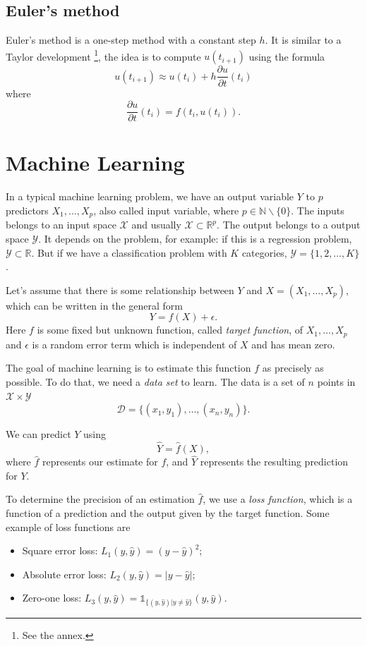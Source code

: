 \documentclass[10pt,a4paper]{article}
\theoremstyle{definition}
\theoremstyle{definition}
\theoremstyle{definition}
\begin{document}
\subsection{Euler's method} \label{euler}
Euler's method is a one-step method with a constant step $h$. It is similar to a Taylor development \footnote{See the annex.}, the idea is to compute $u(t_{i+1})$ using the formula
$$
u(t_{i+1}) \approx u(t_i) + h\frac{\partial u}{\partial t}(t_i)
$$
where 
$$
\frac{\partial u}{\partial t}(t_i) = f(t_i, u(t_i)).
$$


\section{Machine Learning}
In a typical machine learning problem, we have an output variable $Y$ to $p$ predictors $X_1,\dots, X_p$, also called input variable, where $p\in \mathbb{N}\backslash \{0\}$. The inputs belongs to an input space $\mathcal{X}$ and usually $\mathcal{X} \subset \mathbb{R}^p$. The output belongs to a output space $\mathcal{Y}$. It depends on the problem, for example: if this is a regression problem, $\mathcal{Y} \subset \mathbb{R}$. But if we have a classification problem with $K$ categories, $\mathcal{Y} = \{1,2,\dots, K\}$.

Let's assume that there is some relationship between $Y$ and $X = (X_1,\dots, X_p)$, which can be written in the general form
$$
Y = f(X) + \epsilon.
$$
Here $f$ is some fixed but unknown function, called \textit{target function}, of $X_1, \dots, X_p$ and $\epsilon$ is a random error term which is independent of $X$ and has mean zero.

The goal of machine learning is to estimate this function $f$ as precisely as possible. To do that, we need a \textit{data set} to learn. The data is a set of $n$ points in $\mathcal{X} \times \mathcal{Y}$
$$
\mathcal{D} = \{(x_1, y_1),\dots, (x_n,y_n)\}.
$$

We can predict $Y$ using
$$
\hat{Y} = \hat{f}(X),
$$
where $\hat{f}$ represents our estimate for $f$, and $\hat{Y}$ represents the resulting prediction for $Y$.

To determine the precision of an estimation $\hat{f}$, we use a \textit{loss function}, which is a function of a prediction and the output given by the target function. Some example of loss functions are
\begin{itemize}
\item Square error loss: $L_1(y, \hat{y}) = (y-\hat{y})^2$;
\item Absolute error loss: $L_2(y, \hat{y}) = |y - \hat{y}|$;
\item Zero-one loss: $L_3(y, \hat{y}) = \mathds{1}_{\{(y, \hat{y}) | y\neq \hat{y}\}}(y, \hat{y})$.
\end{itemize}
\end{document}

